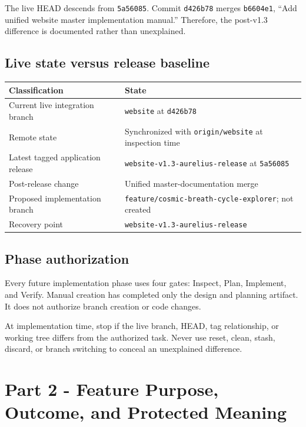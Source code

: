 \documentclass[11pt,letterpaper]{article}
\newcommand{\branchname}[1]{\texttt{#1}}
\newcommand{\release}[1]{\texttt{#1}}
\begin{document}
The live HEAD descends from \release{5a56085}. Commit \release{d426b78} merges \release{b6604e1}, ``Add unified website master implementation manual.'' Therefore, the post-v1.3 difference is documented rather than unexplained.

\subsection{Live state versus release baseline}
\begin{tabularx}{\textwidth}{L{2.25in}Y}
\toprule
\textbf{Classification} & \textbf{State} \\
\midrule
Current live integration branch & \branchname{website} at \release{d426b78} \\
Remote state & Synchronized with \branchname{origin/website} at inspection time \\
Latest tagged application release & \release{website-v1.3-aurelius-release} at \release{5a56085} \\
Post-release change & Unified master-documentation merge \\
Proposed implementation branch & \branchname{feature/cosmic-breath-cycle-explorer}; not created \\
Recovery point & \release{website-v1.3-aurelius-release} \\
\bottomrule
\end{tabularx}

\subsection{Phase authorization}
Every future implementation phase uses four gates: Inspect, Plan, Implement, and Verify. Manual creation has completed only the design and planning artifact. It does not authorize branch creation or code changes.

\begin{warningbox}
At implementation time, stop if the live branch, HEAD, tag relationship, or working tree differs from the authorized task. Never use reset, clean, stash, discard, or branch switching to conceal an unexplained difference.
\end{warningbox}

\section{Part 2 - Feature Purpose, Outcome, and Protected Meaning}
\end{document}
